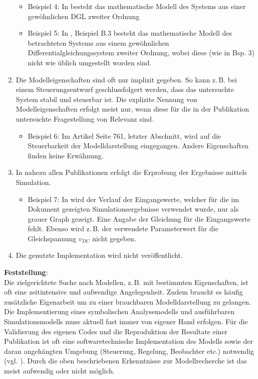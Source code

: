 \begin{enumerate}
\begin{itemize}[label=$\bullet$]
		\item Beispiel 4: In \cite[Seite 3]{BUT21} besteht das mathematische Modell des Systems aus einer gewöhnlichen DGL zweiter Ordnung
		\item Beispiel 5: In \cite[Seite 168f]{KNO16}, Beispiel B.3 besteht das mathematische Modell des betrachteten Systems aus einem gewöhnlichen Differentialgleichungssystem zweiter Ordnung, wobei diese (wie in Bsp. 3) nicht wie üblich umgestellt worden sind.
	\end{itemize}
	\item  Die Modelleigenschaften sind oft nur implizit gegeben. So kann z.\,B. bei einem Steuerungsentwurf geschlussfolgert werden, dass das untersuchte System stabil und steuerbar ist. Die explizite Nennung von Modelleigenschaften erfolgt meist nur, wenn diese für die in der Publikation untersuchte Fragestellung von Relevanz sind. 
	\begin{itemize}[label=$\bullet$]
		\item Beispiel 6: Im Artikel \cite{PEGUEA16} Seite 761, letzter Abschnitt, wird auf die Steuerbarkeit der Modelldarstellung eingegangen. Andere Eigenschaften finden keine Erwähnung.
	\end{itemize}
	\item In nahezu allen Publikationen erfolgt die Erprobung der Ergebnisse mittels Simulation. 
	\begin{itemize}[label=$\bullet$]
		\item Beispiel 7: In \cite{BUT21} wird der Verlauf der Eingangswerte, welcher für die im Dokument gezeigten Simulationsergebnisse verwendet wurde, nur als grauer Graph gezeigt. Eine Angabe der Gleichung für die Eingangswerte fehlt. Ebenso wird z.\,B. der verwendete Parameterwert für die Gleichspannung $v_{DC}$ nicht gegeben.
	\end{itemize}
	\item Die genutzte Implementation wird nicht veröffentlicht.
\end{enumerate}

\textbf{Feststellung}:\\
Die zielgerichtete Suche nach Modellen, z.\,B. mit bestimmten Eigenschaften, ist oft eine zeitintensive und aufwendige Angelegenheit. Zudem braucht es häufig zusätzliche Eigenarbeit um zu einer brauchbaren Modelldarstellung zu gelangen. Die Implementierung eines symbolischen Analysemodells und ausführbaren Simulationsmodells muss aktuell fast immer von eigener Hand erfolgen. Für die Validierung des eigenen Codes und die Reproduktion der Resultate einer Publikation ist oft eine softwaretechnische Implementation des Modells sowie der daran angehängten Umgebung (Steuerung, Regelung, Beobachter etc.) notwendig (vgl. \cite[S. 1]{KNHE20b}). Durch die oben beschriebenen Erkenntnisse zur Modellrecherche ist das meist aufwendig oder nicht möglich.

